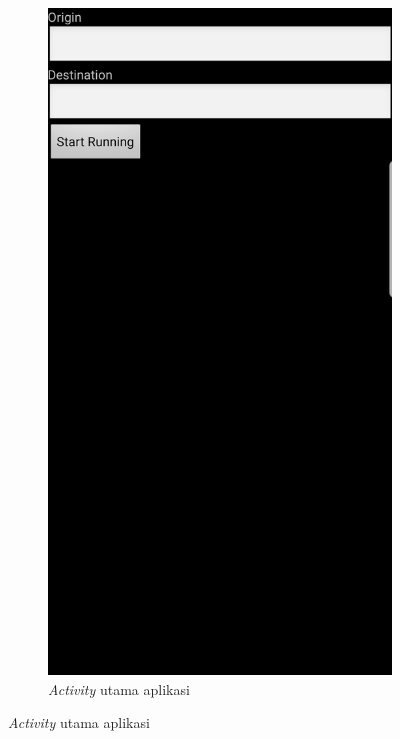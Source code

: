\begin{figure}[!hp]
  \centering
  \begin{subfigure}[b]{0.3\textwidth}
    \includegraphics[width=\textwidth]{Gambar/main-page.png}
    \caption{\textit{Activity} utama aplikasi}\label{fig:main-page}
  \end{subfigure}

\end{figure}

